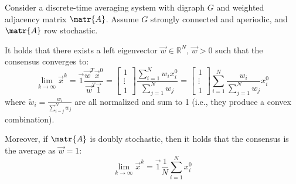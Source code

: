 \begin{theorem} 
    Consider a discrete-time averaging system with digraph $G$ and weighted adjacency matrix $\matr{A}$. Assume $G$ strongly connected and aperiodic, and $\matr{A}$ row stochastic. 
    
    It holds that there exists a left eigenvector $\vec{w} \in \mathbb{R}^N$, $\vec{w} > 0$ such that the consensus converges to:
        \[ 
            \lim_{k \rightarrow \infty} \vec{x}^k 
            = \vec{1}\frac{\vec{w}^T \vec{x}^0}{\vec{w}^T\vec{1}} 
            = \begin{bmatrix} 1 \\ \vdots \\ 1 \end{bmatrix} \frac{\sum_{i=1}^N w_i x_i^0}{\sum_{j=1}^N w_j}
            = \begin{bmatrix} 1 \\ \vdots \\ 1 \end{bmatrix} \sum_{i=1}^N \frac{w_i}{\sum_{j=1}^N w_j} x_i^0
        \]
        where $\tilde{w}_i = \frac{w_i}{\sum_{i=j}^N w_j}$ are all normalized and sum to 1 (i.e., they produce a convex combination).

    Moreover, if $\matr{A}$ is doubly stochastic, then it holds that the consensus is the average as $\vec{w} = 1$:
    \[ 
        \lim_{k \rightarrow \infty} \vec{x}^k = \vec{1} \frac{1}{N} \sum_{i=1}^N x_i^0
    \]



\end{theorem}
